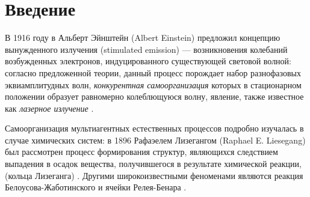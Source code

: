\chapter{Введение}
\label{chap:Intro}









В 1916 году в \cite{einstein} Альберт Эйнштейн (Albert Einstein) предложил концепцию вынужденного излучения (stimulated emission) --- возникновения колебаний возбужденных электронов, индуцированного существующей световой волной: согласно предложенной теории, данный процесс порождает набор разнофазовых эквиамплитудных волн, \emph{конкурентная самоорганизация} которых в стационарном положении образует равномерно колеблющуюся волну, явление, также известное как \emph{лазерное излучение} \cite{steen}. 

Самоорганизация мультиагентных естественных процессов подробно изучалась в случае химических систем: в 1896 Рафаэелем Лизегангом (Raphael E. Liesegang)  был рассмотрен процесс формирования структур, являющихся следствием выпадения в осадок вещества, получившегося в результате химической реакции, (кольца Лизеганга) \cite{leis}. Другими широкоизвестными феноменами являются реакция Белоусова-Жаботинского \cite{belousov} и ячейки Релея-Бенара \cite{benard}.
